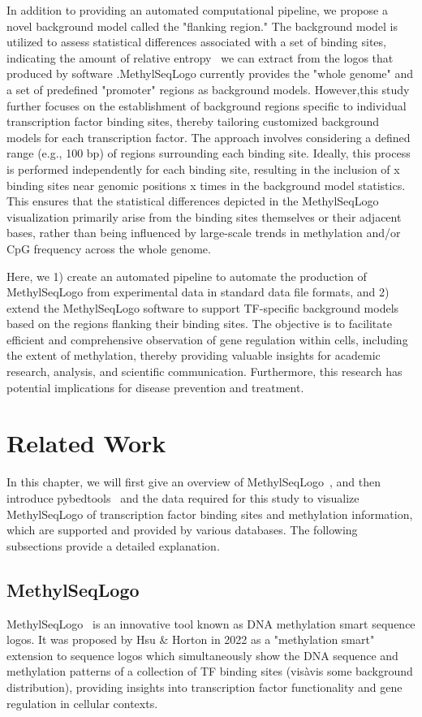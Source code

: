 \documentclass{PHlab-thesis}
\begin{document}
In addition to providing an automated computational pipeline, we propose a novel background model called the "flanking region." The background model is utilized to assess statistical differences associated with a set of binding sites, indicating the amount of relative entropy~\cite{kullback1951information} we can extract from the logos that produced by software .MethylSeqLogo currently provides the "whole genome" and a set of predefined "promoter" regions as background models. However,this study further focuses on the establishment of background regions specific to individual transcription factor binding sites, thereby tailoring customized background models for each transcription factor. The approach involves considering a defined range (e.g., 100 bp) of regions surrounding each binding site. Ideally, this process is performed independently for each binding site, resulting in the inclusion of x binding sites near genomic positions x times in the background model statistics. This ensures that the statistical differences depicted in the MethylSeqLogo visualization primarily arise from the binding sites themselves or their adjacent bases, rather than being influenced by large-scale trends in methylation and/or CpG frequency across the whole genome.

Here, we 1) create an automated pipeline to automate the production of MethylSeqLogo from experimental data in standard data file formats, and 2) extend the MethylSeqLogo software to support TF-specific background models based on the regions flanking their binding sites. The objective is to facilitate efficient and comprehensive observation of gene regulation within cells, including the extent of methylation, thereby providing valuable insights for academic research, analysis, and scientific communication. Furthermore, this research has potential implications for disease prevention and treatment.
\chapter{Related Work}
In this chapter, we will first give an overview of MethylSeqLogo~\cite{Hsu2022.11.05.515271}, and then introduce pybedtools~\cite{10.1093/bioinformatics/btr539} and the data required for this study to visualize MethylSeqLogo of transcription factor binding sites and methylation information, which are supported and provided by various databases. The following subsections provide a detailed explanation.
\section{MethylSeqLogo}
MethylSeqLogo~\cite{Hsu2022.11.05.515271} is an innovative tool known as DNA methylation smart sequence logos. It was proposed by Hsu \& Horton in 2022 as a "methylation smart" extension to sequence logos which simultaneously show the DNA sequence and methylation patterns of a collection of TF binding sites (visàvis some background distribution), providing insights into transcription factor functionality and gene regulation in cellular contexts.
\end{document}
